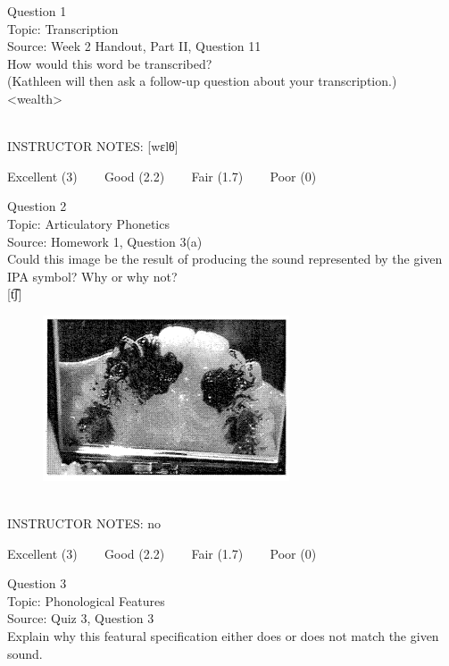 \documentclass[12pt]{article}
\begin{document}
{\large Question 1}\\

Topic: Transcription\\
Source: Week 2 Handout, Part II, Question 11\\

How would this word be transcribed?\\ (Kathleen will then ask a follow-up question about your transcription.)\\

<wealth>


~\\
INSTRUCTOR NOTES: [wɛlθ]


\vfill
Excellent (3) ~~~ Good (2.2) ~~~ Fair (1.7) ~~~ Poor (0)
\newpage

{\large Question 2}\\

Topic: Articulatory Phonetics\\
Source: Homework 1, Question 3(a)\\

Could this image be the result of producing the sound represented by the given IPA symbol? Why or why not?\\

{[t͡ʃ]}

\begin{figure}[H]
\includegraphics{../images/staticpalatography_fricative.png}
\end{figure}

~\\
INSTRUCTOR NOTES: no


\vfill
Excellent (3) ~~~ Good (2.2) ~~~ Fair (1.7) ~~~ Poor (0)
\newpage

{\large Question 3}\\

Topic: Phonological Features\\
Source: Quiz 3, Question 3\\

Explain why this featural specification either does or does not match the given sound.\\
\end{document}
